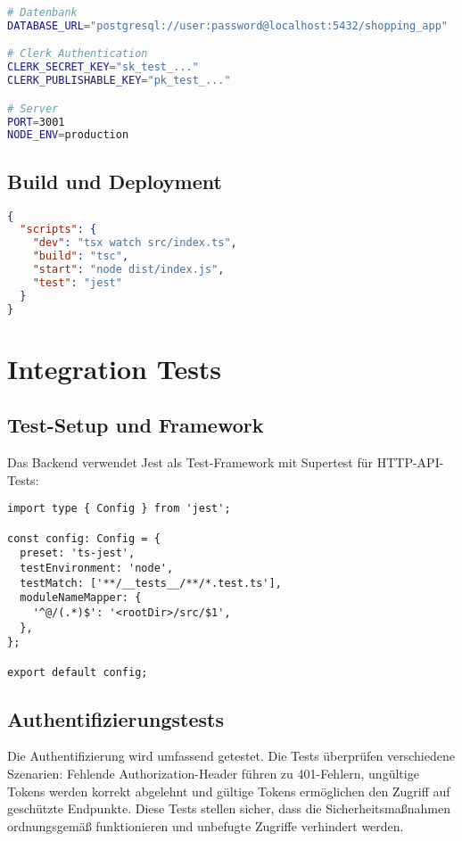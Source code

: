 \begin{lstlisting}[language=bash,caption={Umgebungsvariablen}]
# Datenbank
DATABASE_URL="postgresql://user:password@localhost:5432/shopping_app"

# Clerk Authentication
CLERK_SECRET_KEY="sk_test_..."
CLERK_PUBLISHABLE_KEY="pk_test_..."

# Server
PORT=3001
NODE_ENV=production
\end{lstlisting}

\subsection{Build und Deployment}

\begin{lstlisting}[language=json,caption={Package.json Scripts}]
{
  "scripts": {
    "dev": "tsx watch src/index.ts",
    "build": "tsc",
    "start": "node dist/index.js",
    "test": "jest"
  }
}
\end{lstlisting}



\section{Integration Tests}

\subsection{Test-Setup und Framework}

Das Backend verwendet Jest als Test-Framework mit Supertest für HTTP-API-Tests:

\begin{lstlisting}[style=typescriptstyle,caption={Jest-Konfiguration}]
import type { Config } from 'jest';

const config: Config = {
  preset: 'ts-jest',
  testEnvironment: 'node',
  testMatch: ['**/__tests__/**/*.test.ts'],
  moduleNameMapper: {
    '^@/(.*)$': '<rootDir>/src/$1',
  },
};

export default config;
\end{lstlisting}

\subsection{Authentifizierungstests}

Die Authentifizierung wird umfassend getestet. Die Tests überprüfen verschiedene Szenarien: Fehlende Authorization-Header führen zu 401-Fehlern, ungültige Tokens werden korrekt abgelehnt und gültige Tokens ermöglichen den Zugriff auf geschützte Endpunkte. Diese Tests stellen sicher, dass die Sicherheitsmaßnahmen ordnungsgemäß funktionieren und unbefugte Zugriffe verhindert werden.


